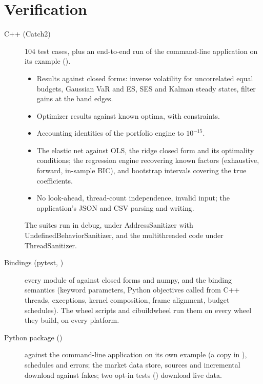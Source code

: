 
\chapter{Verification}\label{c:sec:verification}
\begin{description}
  \item[C++ (Catch2)] 104 test cases, plus an end-to-end run of the command-line application on its example
        ().
        \begin{itemize}
          \item Results against closed forms: inverse volatility for uncorrelated equal budgets, Gaussian VaR and
                ES, SES and Kalman steady states, filter gains at the band edges.
          \item Optimizer results against known optima, with constraints.
          \item Accounting identities of the portfolio engine to $10^{-15}$.
          \item The elastic net against OLS, the ridge closed form and its optimality conditions; the regression
                engine recovering known factors (exhaustive, forward, in-sample BIC), and bootstrap intervals
                covering the true coefficients.
          \item No look-ahead, thread-count independence, invalid input; the application's JSON and CSV parsing
                and writing.
        \end{itemize}
        The suites run in debug, under AddressSanitizer with UndefinedBehaviorSanitizer, and the multithreaded code
        under ThreadSanitizer.
  \item[Bindings (pytest, )] every module of  against
        closed forms and numpy, and the binding semantics (keyword parameters, Python objectives called from C++
        threads, exceptions, kernel composition, frame alignment, budget schedules). The wheel scripts and
        cibuildwheel run them on every wheel they build, on every platform.
  \item[Python package ()]  against the command-line application on
        its own example (a copy in ), schedules and errors; the market data store, sources and
        incremental download against fakes; two opt-in tests () download live data.

\end{description}
